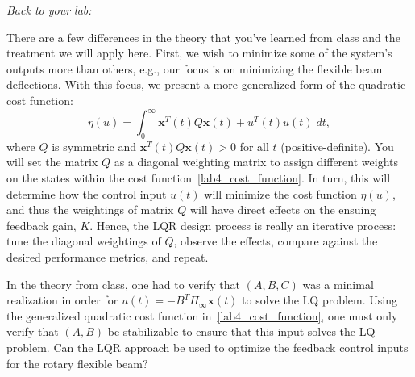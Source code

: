 \noindent \emph{Back to your lab:}

There are a few differences in the theory that you've learned from class and the treatment we will apply here. First, we wish to minimize some of the system's outputs more than others, e.g., our focus is on minimizing the flexible beam deflections. With this focus, we present a more generalized form of the quadratic cost function:
\begin{equation}\label{lab4_cost_function}
    \eta(u) = \int_0^{\infty} \mathbf{x}^T(t) Q \mathbf{x}(t) + u^T(t)u(t) \; dt,
\end{equation}
where $Q$ is symmetric and $\mathbf{x}^T(t) Q \mathbf{x}(t) > 0$ for all $t$ (positive-definite). You will set the matrix $Q$ as a diagonal weighting matrix to assign different weights on the states within the cost function~\eqref{lab4_cost_function}. In turn, this will determine how the control input $u(t)$ will minimize the cost function $\eta(u)$, and thus the weightings of matrix $Q$ will have direct effects on the ensuing feedback gain, $K$. Hence, the LQR design process is really an iterative process: tune the diagonal weightings of $Q$, observe the effects, compare against the desired performance metrics, and repeat.

In the theory from class, one had to verify that $(A,B,C)$ was a minimal realization in order for $u(t)=-B^T \Pi_{\infty} \mathbf{x}(t)$ to solve the LQ problem. Using the generalized quadratic cost function in~\eqref{lab4_cost_function}, one must only verify that $(A,B)$ be stabilizable to ensure that this input solves the LQ problem. Can the LQR approach be used to optimize the feedback control inputs for the rotary flexible beam?\\

